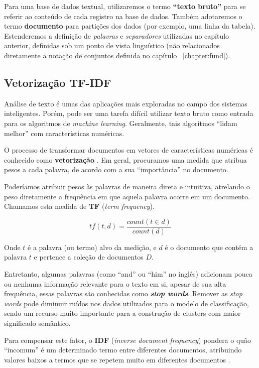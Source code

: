  Para uma base de dados textual,  utilizaremos o termo \textbf{``texto bruto''}  para se referir ao conteúdo de cada registro na base de dados. 
 Também adotaremos o termo \textbf{documento} para partições dos dados (por exemplo, uma linha da tabela).
 Estenderemos a definição de \emph{palavras} e \emph{separadores} utilizadas no capítulo anterior, definidas sob um ponto de vista linguístico (não relacionados diretamente a notação de conjuntos definida no capítulo ~\ref{chapter:fund}).
 
 \subsection{Vetorização TF-IDF}
Análise de texto é umas das aplicações mais exploradas no campo dos sistemas inteligentes.
Porém, pode ser uma tarefa difícil utilizar texto bruto como entrada para os algoritmos de \emph{machine learning}. 
Geralmente, tais algoritmos ``lidam melhor'' com características numéricas.
 
O processo de transformar documentos em vetores de características numéricas é conhecido como \textbf{vetorização} \cite{Qaiser}. 
Em geral, procuramos uma medida que atribua pesos a cada palavra, de acordo com a sua ``importância'' no documento.

Poderíamos atribuir pesos às palavras de maneira direta e intuitiva, atrelando o peso diretamente a frequência em que aquela palavra ocorre em um documento.
Chamamos esta medida de \textbf{TF} (\emph{term frequency}).

\begin{equation}\label{eq:tf}
tf(t, d) = \frac{count(t \in d)}{count(d)}
\end{equation}

Onde $t$ é a palavra (ou termo) alvo da medição, e $d$ é o documento que contém a palavra $t$  e pertence a coleção de documentos $D$.

Entretanto, algumas palavras (como ``and'' ou ``him'' no inglês) adicionam pouca ou nenhuma informação relevante para o texto em si, apesar de sua alta frequência, essas palavras são conhecidas como \textbf{\emph{stop words}}.
Remover as \emph{stop words} pode diminuir ruídos nos dados utilizados para o modelo de classificação, sendo um recurso muito importante para a construção de clusters com maior significado semântico.

Para compensar este fator, o \textbf{IDF} (\emph{inverse document frequency}) pondera o quão ``incomum'' é um determinado termo entre diferentes documentos, atribuindo valores baixos a termos que se repetem muito em diferentes documentos \cite{Qaiser}.

